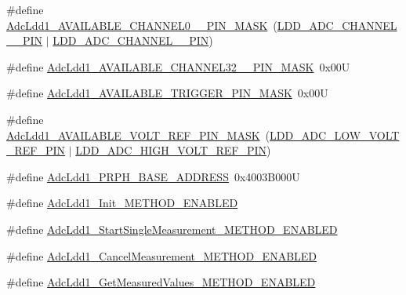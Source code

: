 \begin{DoxyCompactItemize}
\item 
\#define \hyperlink{group___adc_ldd1__module_gae667536b042ed10bbf59a6ab655e2520}{Adc\+Ldd1\+\_\+\+A\+V\+A\+I\+L\+A\+B\+L\+E\+\_\+\+C\+H\+A\+N\+N\+E\+L0\+\_\+\_\+\+P\+I\+N\+\_\+\+M\+A\+SK}~(\hyperlink{group___p_e___types__module_ga68b9b7285d322b045dc99ae29c120b7d}{L\+D\+D\+\_\+\+A\+D\+C\+\_\+\+C\+H\+A\+N\+N\+E\+L\+\_\+\_\+\+P\+IN} $\vert$ \hyperlink{group___p_e___types__module_ga3281a80161f65f2886a42af1564edcda}{L\+D\+D\+\_\+\+A\+D\+C\+\_\+\+C\+H\+A\+N\+N\+E\+L\+\_\+\_\+\+P\+IN})
\item 
\#define \hyperlink{group___adc_ldd1__module_ga76e2c2c848190a43f723097450d2bd44}{Adc\+Ldd1\+\_\+\+A\+V\+A\+I\+L\+A\+B\+L\+E\+\_\+\+C\+H\+A\+N\+N\+E\+L32\+\_\+\_\+\+P\+I\+N\+\_\+\+M\+A\+SK}~0x00U
\item 
\#define \hyperlink{group___adc_ldd1__module_ga9364f8d60a68e5f5546eb5bf87436569}{Adc\+Ldd1\+\_\+\+A\+V\+A\+I\+L\+A\+B\+L\+E\+\_\+\+T\+R\+I\+G\+G\+E\+R\+\_\+\+P\+I\+N\+\_\+\+M\+A\+SK}~0x00U
\item 
\#define \hyperlink{group___adc_ldd1__module_ga42c6c07d48741426405776dfc62732a6}{Adc\+Ldd1\+\_\+\+A\+V\+A\+I\+L\+A\+B\+L\+E\+\_\+\+V\+O\+L\+T\+\_\+\+R\+E\+F\+\_\+\+P\+I\+N\+\_\+\+M\+A\+SK}~(\hyperlink{group___p_e___types__module_ga2aca9e4004ca4eb785f08bd3c07c7f8a}{L\+D\+D\+\_\+\+A\+D\+C\+\_\+\+L\+O\+W\+\_\+\+V\+O\+L\+T\+\_\+\+R\+E\+F\+\_\+\+P\+IN} $\vert$ \hyperlink{group___p_e___types__module_ga1c613e5f56972bb45b94fa9d272f9589}{L\+D\+D\+\_\+\+A\+D\+C\+\_\+\+H\+I\+G\+H\+\_\+\+V\+O\+L\+T\+\_\+\+R\+E\+F\+\_\+\+P\+IN})
\item 
\#define \hyperlink{group___adc_ldd1__module_ga7d69dbadf1bf96582b0bc8677162cadf}{Adc\+Ldd1\+\_\+\+P\+R\+P\+H\+\_\+\+B\+A\+S\+E\+\_\+\+A\+D\+D\+R\+E\+SS}~0x4003\+B000U
\item 
\#define \hyperlink{group___adc_ldd1__module_ga49d23fa753cfb435ad0ecc28c582987e}{Adc\+Ldd1\+\_\+\+Init\+\_\+\+M\+E\+T\+H\+O\+D\+\_\+\+E\+N\+A\+B\+L\+ED}
\item 
\#define \hyperlink{group___adc_ldd1__module_gaf2efa18f3ace8958bffdf8bcfbea8034}{Adc\+Ldd1\+\_\+\+Start\+Single\+Measurement\+\_\+\+M\+E\+T\+H\+O\+D\+\_\+\+E\+N\+A\+B\+L\+ED}
\item 
\#define \hyperlink{group___adc_ldd1__module_gac8248dbbc82166f5d84209b42574e893}{Adc\+Ldd1\+\_\+\+Cancel\+Measurement\+\_\+\+M\+E\+T\+H\+O\+D\+\_\+\+E\+N\+A\+B\+L\+ED}
\item 
\#define \hyperlink{group___adc_ldd1__module_ga4336debe2c49b40ec5cf443ebdc14fd4}{Adc\+Ldd1\+\_\+\+Get\+Measured\+Values\+\_\+\+M\+E\+T\+H\+O\+D\+\_\+\+E\+N\+A\+B\+L\+ED}

\end{DoxyCompactItemize}
